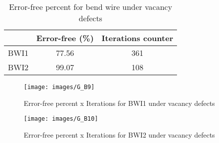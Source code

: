 \begin{table}[h]
\begin{center}
\caption{Error-free percent for bend wire under vacancy defects}
\begin{tabular}{|c|c|c|}
\hline
 & Error-free (\%) & Iterations counter \\
\hline
 BWI1 & 77.56 & 361 \\
\hline
 BWI2 & 99.07 & 108 \\
\hline

\end{tabular}

\end{center}
\end{table}
\begin{figure}[h!]
\center
\texttt{[image: images/G\_B9]}
\caption{Error-free percent x Iterations for BWI1 under vacancy defects}
\label{figure:bentwire_reg_gt5}
\end{figure}

\begin{figure}[h!]
\center
\texttt{[image: images/G\_B10]}
\caption{Error-free percent x Iterations for BWI2 under vacancy defects}
\label{figure:bentwire_mod_gt5}
\end{figure}
\pagebreak